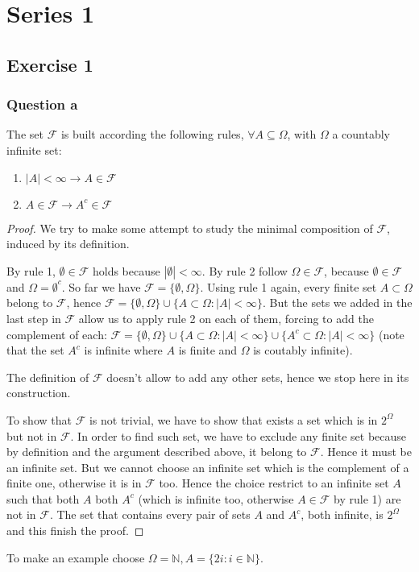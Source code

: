 
\section{Series 1}
\subsection{Exercise 1}
\subsubsection{Question a}
The set $\mathcal{F}$ is built according the following rules, $\forall
A \subseteq \Omega$, with $\Omega$ a countably infinite set:
\begin{enumerate}
\item $|A| < \infty \rightarrow A \in \mathcal{F}$
\item $A \in \mathcal{F} \rightarrow A^c \in \mathcal{F}$
\end{enumerate}
\begin{proof}
  We try to make some attempt to study the minimal composition of
  $\mathcal{F}$, induced by its definition.

  By rule 1, $\emptyset \in \mathcal{F}$ holds because $|\emptyset| <
  \infty$. By rule 2 follow $\Omega \in \mathcal{F}$, because
  $\emptyset \in \mathcal{F}$ and $\Omega = \emptyset^c$. So far we
  have $\mathcal{F} = \{\emptyset, \Omega \}$. Using rule 1 again,
  every finite set $A \subset \Omega$ belong to $\mathcal{F}$, hence
  $\mathcal{F} = \{\emptyset, \Omega \} \cup \{A \subset \Omega:
  |A|<\infty\}$. But the sets we added in the last step in
  $\mathcal{F}$ allow us to apply rule 2 on each of them, forcing to
  add the complement of each: $\mathcal{F} = \{\emptyset, \Omega \}
  \cup \{A \subset \Omega: |A|<\infty\} \cup \{A^c \subset \Omega:
  |A|<\infty\}$ (note that the set $A^c$ is infinite where $A$ is
  finite and $\Omega$ is coutably infinite).

  The definition of $\mathcal{F}$ doesn't allow to add any other sets,
  hence we stop here in its construction.

  To show that $\mathcal{F}$ is not trivial, we have to show that
  exists a set which is in $2^{\Omega}$ but not in $\mathcal{F}$. In
  order to find such set, we have to exclude any finite set because by
  definition and the argument described above, it belong to
  $\mathcal{F}$. Hence it must be an infinite set. But we cannot
  choose an infinite set which is the complement of a finite one,
  otherwise it is in $\mathcal{F}$ too. Hence the choice restrict to
  an infinite set $A$ such that both $A$ both $A^c$ (which is infinite
  too, otherwise $A \in \mathcal{F}$ by rule 1) are not in
  $\mathcal{F}$. The set that contains every pair of sets $A$ and
  $A^c$, both infinite, is $2^\Omega$ and this finish the proof.
\end{proof}
To make an example choose $\Omega = \mathbb{N}, A = \{2i:i \in
\mathbb{N}\}$.

